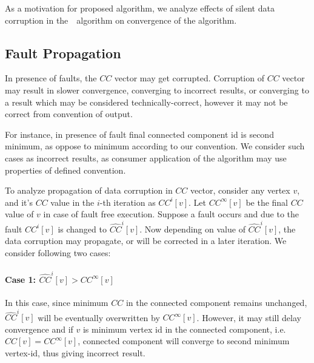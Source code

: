 

As a motivation for proposed algorithm, we analyze effects of silent data corruption in the~\sv~algorithm on convergence of the algorithm.

\subsection{Fault Propagation}
In presence of faults, the $CC$ vector may get corrupted.
Corruption of $CC$ vector may result in slower convergence, converging to incorrect results, or converging to a result which may be considered technically-correct, however it may not be correct from
convention of output. 

For instance, in presence of fault 
 final connected component id is second minimum, as oppose to minimum according to our convention.
We consider such cases as incorrect results, as consumer application of the algorithm may use properties of defined convention.


To analyze propagation of data corruption in $CC$ vector, consider any vertex $v$, and it's $CC$ value in the $i$-th 
iteration as $CC^{i}[v]$. Let $CC^{\infty}[v]$ be the final $CC$ value of $v$ in case of fault free execution. Suppose a fault occurs and due to the fault $CC^{i}[v]$ is changed to $\hat{CC}^{i}[v]$.
Now depending on value of $\hat{CC}^{i}[v]$, the data corruption may propagate, or will be corrected in a later iteration. We consider following two cases:

\paragraph{Case 1: $\hat{CC}^{i}[v] > CC^{\infty}[v]$} 
In this case, since minimum $CC$ in the connected component remains unchanged,  $\hat{CC}^{i}[v]$ will be eventually overwritten by $CC^{\infty}[v]$. However, it may still delay convergence and if $v$ is minimum vertex id in the connected component, i.e. $CC[v]=CC^{\infty}[v]$, connected component will converge to second minimum vertex-id, thus giving incorrect result.


